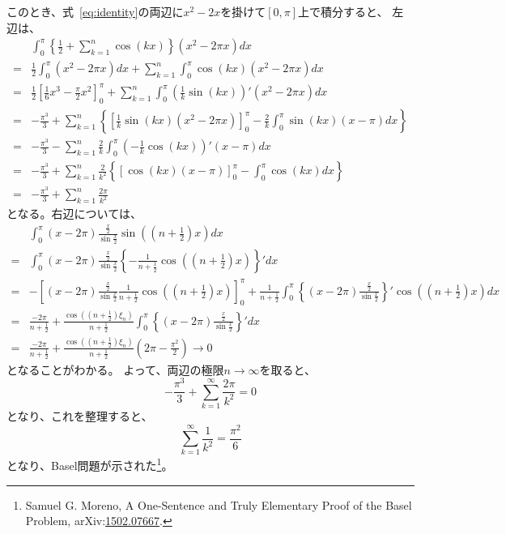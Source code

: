 \documentclass{jsarticle}
\begin{document}
このとき、式~\eqref{eq:identity}の両辺に$x^{2}-2x$を掛けて$[0,\pi]$上で積分すると、
左辺は、
\begin{align}
	&\int_{0}^{\pi}\left\{\frac{1}{2}+\sum_{k=1}^{n}\cos(kx)\right\}(x^{2}-2\pi x)dx\\
	=&\frac{1}{2}\int_{0}^{\pi}(x^{2}-2\pi x)dx+\sum_{k=1}^{n}\int_{0}^{\pi}\cos(kx)(x^2-2\pi x)dx\\
	=&\frac{1}{2}\left[\frac{1}{6}x^{3}-\frac{\pi}{2}x^{2}\right]_{0}^{\pi}
	+\sum_{k=1}^{n}\int_{0}^{\pi}\left(\frac{1}{k}\sin(kx)\right)'(x^{2}-2\pi x)dx\\
	=&-\frac{\pi^{3}}{3}
	+\sum_{k=1}^{n}\left\{\left[\frac{1}{k}\sin(kx)(x^2-2\pi x)\right]_{0}^{\pi}
	-\frac{2}{k}\int_{0}^{\pi}\sin(kx)(x-\pi)dx\right\}\\
	=&-\frac{\pi^{3}}{3}
	-\sum_{k=1}^{n}\frac{2}{k}\int_{0}^{\pi}\left(-\frac{1}{k}\cos(kx)\right)'(x-\pi)dx\\
	=&-\frac{\pi^{3}}{3}+\sum_{k=1}^{n}\frac{2}{k^{2}}
	\left\{\left[\cos(kx)(x-\pi)\right]_{0}^{\pi}
	-\int_{0}^{\pi}\cos(kx)dx
	\right\}\\
	=&-\frac{\pi^{3}}{3}+\sum_{k=1}^{n}\frac{2\pi}{k^{2}}
\end{align}
となる。右辺については、
\begin{align}
	&\int_{0}^{\pi}(x-2\pi)\frac{\frac{x}{2}}{\sin\frac{x}{2}}\sin\left(\left(n+\frac{1}{2}\right)x\right)dx\\
	=&\int_{0}^{\pi}(x-2\pi)\frac{\frac{x}{2}}{\sin\frac{x}{2}}\left\{-\frac{1}{n+\frac{1}{2}}\cos\left(\left(n+\frac{1}{2}\right)x\right)\right\}'dx\\
	=&-\left[(x-2\pi)\frac{\frac{x}{2}}{\sin\frac{x}{2}}\frac{1}{n+\frac{1}{2}}\cos\left(\left(n+\frac{1}{2}\right)x\right)\right]_{0}^{\pi}
	+\frac{1}{n+\frac{1}{2}}\int_{0}^{\pi}\left\{(x-2\pi)\frac{\frac{x}{2}}{\sin\frac{x}{2}}\right\}'\cos\left(\left(n+\frac{1}{2}\right)x\right)dx\\
	=&\frac{-2\pi}{n+\frac{1}{2}}
	+\frac{\cos\left(\left(n+\frac{1}{2}\right)\xi_{n}\right)}{n+\frac{1}{2}}
	\int_{0}^{\pi}\left\{(x-2\pi)\frac{\frac{x}{2}}{\sin\frac{x}{2}}\right\}'dx\\
	=&\frac{-2\pi}{n+\frac{1}{2}}
	+\frac{\cos\left(\left(n+\frac{1}{2}\right)\xi_{n}\right)}{n+\frac{1}{2}}\left(2\pi-\frac{\pi^{2}}{2}\right)\to0
\end{align}
となることがわかる。
よって、両辺の極限$n\to\infty$を取ると、
\begin{equation}
	-\frac{\pi^{3}}{3}+\sum_{k=1}^{\infty}\frac{2\pi}{k^{2}}=0
\end{equation}
となり、これを整理すると、
\begin{equation}
	\sum_{k=1}^{\infty}\frac{1}{k^{2}}=\frac{\pi^{2}}{6}
\end{equation}
となり、Basel問題が示された\footnote{Samuel G. Moreno,
	A One-Sentence and Truly Elementary Proof of the Basel Problem,
	arXiv:\href{https://arxiv.org/abs/1502.07667}{1502.07667}.}。
\end{document}
